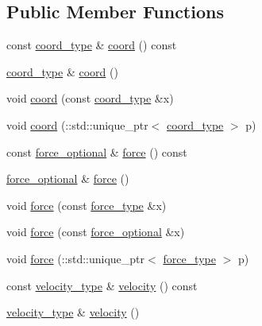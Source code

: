 \subsection*{Public Member Functions}
\begin{DoxyCompactItemize}
\item 
const \hyperlink{classsingle__t_a07d764e683fbb0e8ddd97945f2c01270}{coord\+\_\+type} \& \hyperlink{classsingle__t_a385ac1cabe51a4a6c3bded8e27d94906}{coord} () const 
\item 
\hyperlink{classsingle__t_a07d764e683fbb0e8ddd97945f2c01270}{coord\+\_\+type} \& \hyperlink{classsingle__t_a3d561a81560c220d19f20b890668464d}{coord} ()
\item 
void \hyperlink{classsingle__t_a9d2bd91b3955fcd17fc0a50dcce479a0}{coord} (const \hyperlink{classsingle__t_a07d764e683fbb0e8ddd97945f2c01270}{coord\+\_\+type} \&x)
\item 
void \hyperlink{classsingle__t_aa477c688525dc47de3b401555e80e091}{coord} (\+::std\+::unique\+\_\+ptr$<$ \hyperlink{classsingle__t_a07d764e683fbb0e8ddd97945f2c01270}{coord\+\_\+type} $>$ p)
\item 
const \hyperlink{classsingle__t_a33128be3fe89ddbab885d0a205d35888}{force\+\_\+optional} \& \hyperlink{classsingle__t_a9dd5318bc78873ff6cd71e92b95d8f39}{force} () const 
\item 
\hyperlink{classsingle__t_a33128be3fe89ddbab885d0a205d35888}{force\+\_\+optional} \& \hyperlink{classsingle__t_a4a729c76cbf95d42bebc965526dfc739}{force} ()
\item 
void \hyperlink{classsingle__t_afbfa0efe703c817e1eda807360c577e4}{force} (const \hyperlink{classsingle__t_a1ed86c81a135e0a683e85f53b882817e}{force\+\_\+type} \&x)
\item 
void \hyperlink{classsingle__t_ad492464958bfebb60964334dd49a8c98}{force} (const \hyperlink{classsingle__t_a33128be3fe89ddbab885d0a205d35888}{force\+\_\+optional} \&x)
\item 
void \hyperlink{classsingle__t_ab548ea6047d7b5c100a441e09c79b20e}{force} (\+::std\+::unique\+\_\+ptr$<$ \hyperlink{classsingle__t_a1ed86c81a135e0a683e85f53b882817e}{force\+\_\+type} $>$ p)
\item 
const \hyperlink{classsingle__t_a5aa793b7c32fb659668bbac250ce7d6b}{velocity\+\_\+type} \& \hyperlink{classsingle__t_a865209c855bc4b3e0bfa22820af0602a}{velocity} () const 
\item 
\hyperlink{classsingle__t_a5aa793b7c32fb659668bbac250ce7d6b}{velocity\+\_\+type} \& \hyperlink{classsingle__t_a315489c251504a68a58c9b7ab00a5b39}{velocity} ()

\end{DoxyCompactItemize}
